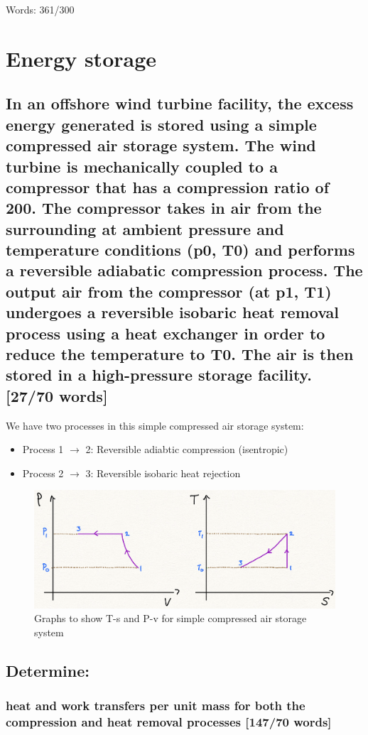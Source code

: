 \documentclass[12pt]{article}
\numberwithin{equation}{section}
\begin{document}
\begin{flushleft}
Words: 361/300
\section{Energy storage}
\subsection[Compressed air storage system.]{In an offshore wind turbine facility, the excess energy generated is stored using a simple compressed air storage system. The wind turbine is mechanically coupled to a compressor that has a compression ratio of 200. The compressor takes in air from the surrounding at ambient pressure and temperature conditions (p0, T0) and performs a reversible adiabatic compression process. The output air from the compressor (at p1, T1) undergoes a reversible isobaric heat removal process using a heat exchanger in order to reduce the temperature to T0. The air is then stored in a high-pressure storage facility. [27/70 words]}
We have two processes in this simple compressed air storage system:
\begin{itemize}
  \item Process 1 $\rightarrow$ 2: Reversible adiabtic compression (isentropic)
  \item Process 2 $\rightarrow$ 3: Reversible isobaric heat rejection
\end{itemize}

\begin{figure}[H]
  \centering
  \includegraphics[width  = \textwidth]{./img/TsPvDiagrams62.png}
  \caption{Graphs to show T-s and P-v for simple compressed air storage system}
\end{figure}

\subsection{Determine:}
\subsubsection[Heat/Work transfers.]{heat and work transfers per unit mass for both the compression and heat removal processes [147/70 words]}

\end{flushleft}
\end{document}
